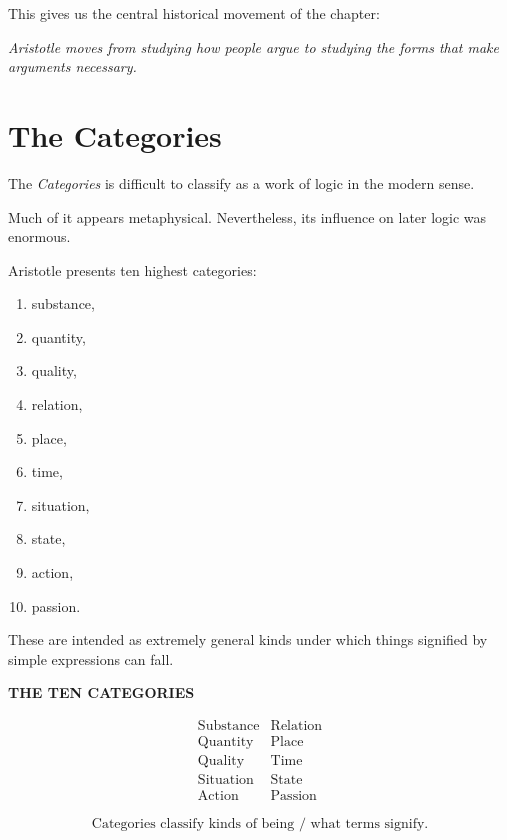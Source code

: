 \documentclass[11pt]{article}
\begin{document}
This gives us the central historical movement of the chapter:

\begin{center}
\emph{Aristotle moves from studying how people argue to studying
the forms that make arguments necessary.}
\end{center}

\section{The Categories}

The \textit{Categories} is difficult to classify as a work of logic
in the modern sense.

Much of it appears metaphysical. Nevertheless, its influence on
later logic was enormous.

Aristotle presents ten highest categories:

\begin{enumerate}
    \item substance,
    \item quantity,
    \item quality,
    \item relation,
    \item place,
    \item time,
    \item situation,
    \item state,
    \item action,
    \item passion.
\end{enumerate}

These are intended as extremely general kinds under which things
signified by simple expressions can fall.

\begin{whiteboard}
\textbf{THE TEN CATEGORIES}

\[
\begin{array}{ll}
\text{Substance} & \text{Relation}\\
\text{Quantity} & \text{Place}\\
\text{Quality} & \text{Time}\\
\text{Situation} & \text{State}\\
\text{Action} & \text{Passion}
\end{array}
\]

\[
\text{Categories classify kinds of being / what terms signify.}
\]
\end{whiteboard}
\end{document}
